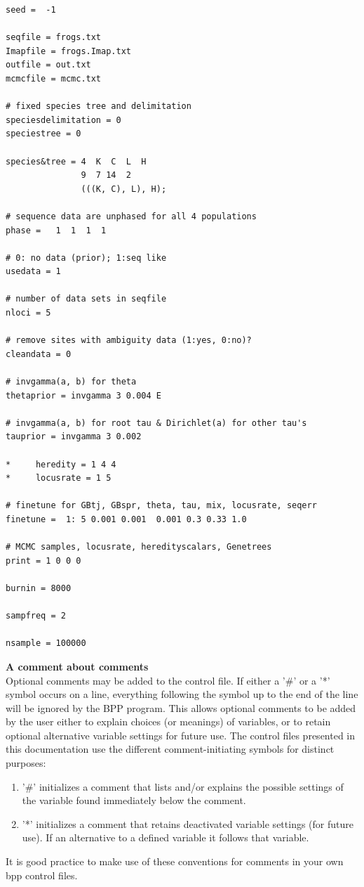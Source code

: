 \documentclass{book}
\numberwithin{equation}{section} \renewcommand{\baselinestretch}{0.55}
\begin{document}
\begin{verbatim}
seed =  -1

seqfile = frogs.txt
Imapfile = frogs.Imap.txt
outfile = out.txt
mcmcfile = mcmc.txt

# fixed species tree and delimitation
speciesdelimitation = 0 
speciestree = 0

species&tree = 4  K  C  L  H
               9  7 14  2
               (((K, C), L), H);

# sequence data are unphased for all 4 populations
phase =   1  1  1  1

# 0: no data (prior); 1:seq like
usedata = 1  

# number of data sets in seqfile
nloci = 5  

# remove sites with ambiguity data (1:yes, 0:no)?
cleandata = 0    

# invgamma(a, b) for theta
thetaprior = invgamma 3 0.004 E  

# invgamma(a, b) for root tau & Dirichlet(a) for other tau's
tauprior = invgamma 3 0.002    

*     heredity = 1 4 4
*     locusrate = 1 5

# finetune for GBtj, GBspr, theta, tau, mix, locusrate, seqerr
finetune =  1: 5 0.001 0.001  0.001 0.3 0.33 1.0  

# MCMC samples, locusrate, heredityscalars, Genetrees
print = 1 0 0 0   

burnin = 8000

sampfreq = 2

nsample = 100000
\end{verbatim}

\begin{mdframed}
  \textbf{A comment about comments} \\
  Optional comments may be added to the control file. If either a '\#'
  or a '*' symbol occurs on a line, everything following the symbol up
  to the end of the line will be ignored by the BPP program.  This
  allows optional comments to be added by the user either to explain
  choices (or meanings) of variables, or to retain optional
  alternative variable settings for future use. The control files
  presented in this documentation use the different comment-initiating
  symbols for distinct purposes:
  \begin{enumerate}
  \item '\#' initializes a comment that lists and/or explains the
    possible settings of the variable found immediately below the
    comment.
  \item '*' initializes a comment that retains deactivated variable
    settings (for future use).  If an alternative to a defined
    variable it follows that variable.
  \end{enumerate}
  It is good practice to make use of these conventions for comments in
  your own bpp control files.
\end{mdframed}
\end{document}
